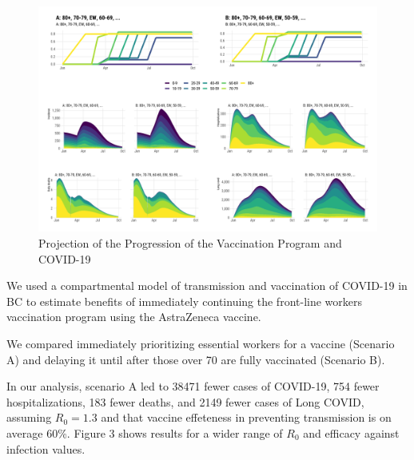 \documentclass[]{interact}
\theoremstyle{plain}%
\theoremstyle{definition}
\theoremstyle{remark}
\begin{document}
\begin{figure}

{\centering \includegraphics[width=1\linewidth]{../figures/fig-trajectoriesFull} 

}

\caption{Projection of the Progression of the Vaccination Program and COVID-19}\label{fig:fig1}
\end{figure}

We used a compartmental model of transmission and vaccination of
COVID-19 in BC to estimate benefits of immediately continuing the
front-line workers vaccination program using the AstraZeneca vaccine.

We compared immediately prioritizing essential workers for a vaccine
(Scenario A) and delaying it until after those over 70 are fully
vaccinated (Scenario B).

In our analysis, scenario A led to 38471 fewer cases of COVID-19, 754
fewer hospitalizations, 183 fewer deaths, and 2149 fewer cases of Long
COVID, assuming \(R_0=1.3\) and that vaccine effeteness in preventing
transmission is on average 60\%. Figure 3 shows results for a wider
range of \(R_0\) and efficacy against infection values.
\end{document}
